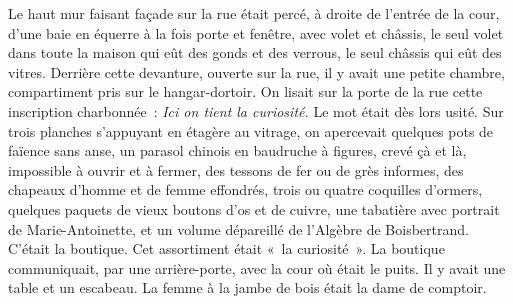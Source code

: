 \documentclass[french,twoside]{book} %
\begin{document}
Le haut mur faisant façade sur la rue était percé, à droite de l’entrée de la cour, d’une baie en équerre à la fois porte et fenêtre, avec volet et châssis, le seul volet dans toute la maison qui eût des gonds et des verrous, le seul châssis qui eût des vitres. Derrière cette devanture, ouverte sur la rue, il y avait une petite chambre, compartiment pris sur le hangar-dortoir. On lisait sur la porte de la rue cette inscription charbonnée : \emph{Ici on tient la curiosité.} Le mot était dès lors usité. Sur trois planches s’appuyant en étagère au vitrage, on apercevait quelques pots de faïence sans anse, un parasol chinois en baudruche à figures, crevé çà et là, impossible à ouvrir et à fermer, des tessons de fer ou de grès informes, des chapeaux d’homme et de femme effondrés, trois ou quatre coquilles d’ormers, quelques paquets de vieux boutons d’os et de cuivre, une tabatière avec portrait de Marie-Antoinette, et un volume dépareillé de l’Algèbre de Boisbertrand. C’était la boutique. Cet assortiment était « la curiosité ». La boutique communiquait, par une arrière-porte, avec la cour où était le puits. Il y avait une table et un escabeau. La femme à la jambe de bois était la dame de comptoir.
\end{document}

